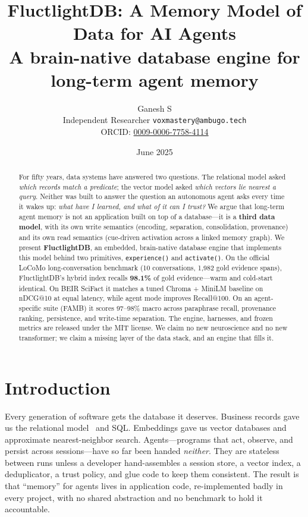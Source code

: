 \documentclass[11pt]{article}
\title{\textbf{FluctlightDB: A Memory Model of Data for AI Agents}\\[0.4em]
\large A brain-native database engine for long-term agent memory}
\author{Ganesh S\\ \small Independent Researcher \quad \texttt{voxmastery@ambugo.tech}\\[0.2em]
\small ORCID: \href{https://orcid.org/0009-0006-7758-4114}{0009-0006-7758-4114}}
\date{June 2025}
\begin{document}
\maketitle

\begin{abstract}
For fifty years, data systems have answered two questions. The relational model
asked \emph{which records match a predicate}; the vector model asked \emph{which
vectors lie nearest a query}. Neither was built to answer the question an
autonomous agent asks every time it wakes up: \emph{what have I learned, and what
of it can I trust?} We argue that long-term agent memory is not an application
built on top of a database---it is a \textbf{third data model}, with its own write
semantics (encoding, separation, consolidation, provenance) and its own read
semantics (cue-driven activation across a linked memory graph). We present
\textbf{FluctlightDB}, an embedded, brain-native database engine that implements
this model behind two primitives, \texttt{experience()} and \texttt{activate()}.
On the official LoCoMo long-conversation benchmark (10 conversations,
1{,}982 gold evidence spans), FluctlightDB's hybrid index recalls \textbf{98.1\%}
of gold evidence---warm and cold-start identical. On BEIR SciFact it matches a
tuned Chroma + MiniLM baseline on nDCG@10 at equal latency, while agent mode
improves Recall@100. On an agent-specific suite (FAMB) it scores 97--98\% macro
across paraphrase recall, provenance ranking, persistence, and write-time
separation. The engine, harnesses, and frozen metrics are released under the MIT
license. We claim no new neuroscience and no new transformer; we claim a missing
layer of the data stack, and an engine that fills it.
\end{abstract}

\section{Introduction}
Every generation of software gets the database it deserves. Business records gave
us the relational model~\cite{codd1970relational} and SQL. Embeddings gave us
vector databases and approximate nearest-neighbor search. Agents---programs that
act, observe, and persist across sessions---have so far been handed \emph{neither}.
They are stateless between runs unless a developer hand-assembles a session store,
a vector index, a deduplicator, a trust policy, and glue code to keep them
consistent. The result is that ``memory'' for agents lives in application code,
re-implemented badly in every project, with no shared abstraction and no
benchmark to hold it accountable.
\end{document}
